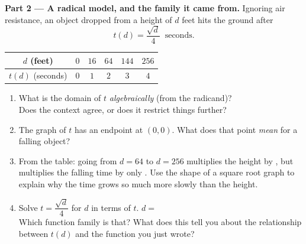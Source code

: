 \documentclass[10pt]{article}
\begin{document}
\begin{tcolorbox}[colback=white, colframe=black!40, title=\textbf{Tier E --- Extension},
    fonttitle=\bfseries, arc=1.5mm, left=3mm, right=3mm, top=2mm, bottom=2mm, breakable]
\vspace{5pt}
\textbf{Part 2 --- A radical model, and the family it came from.} Ignoring air resistance, an object
dropped from a height of $d$ feet hits the ground after
\[
  t(d) = \frac{\sqrt{d}}{4} \ \text{ seconds.}
\]
\begin{center}
\renewcommand{\arraystretch}{1.25}
\begin{tabular}{|c|c|c|c|c|c|}
\hline
$d$ (feet) & $0$ & $16$ & $64$ & $144$ & $256$ \\ \hline
$t(d)$ (seconds) & $0$ & $1$ & $2$ & $3$ & $4$ \\ \hline
\end{tabular}
\end{center}
\begin{enumerate}[label=(\alph*), leftmargin=1.9em, itemsep=6pt]
  \item What is the domain of $t$ \emph{algebraically} (from the radicand)? \ans{$[0,\infty)$} \\
        Does the context agree, or does it restrict things further? 
  \item The graph of $t$ has an endpoint at $(0,0)$. What does that point \emph{mean} for a falling
        object? 
  \item From the table: going from $d=64$ to $d=256$ multiplies the height by , but
        multiplies the falling time by only . Use the shape of a square root graph to
        explain why the time grows so much more slowly than the height. 
  \item Solve $t=\dfrac{\sqrt{d}}{4}$ for $d$ in terms of $t$. \quad $d=$  \\
        Which function family is that?  \quad What does this tell you about the
        relationship between $t(d)$ and the function you just wrote? 
\end{enumerate}
\end{tcolorbox}
\end{document}
